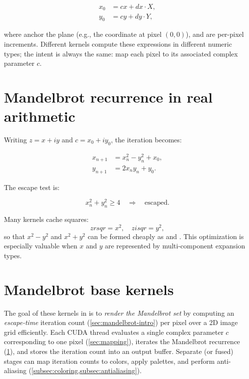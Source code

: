 \begin{align}
x_0 &= cx + dx \cdot X, \\
y_0 &= cy + dy \cdot Y,
\end{align}

where  anchor the plane (e.g., the coordinate at pixel \((0,0)\)),
and  are per-pixel increments. Different kernels compute these
expressions in different numeric types; the intent is always the same: map each
pixel to its associated complex parameter \(c\).


\section{Mandelbrot recurrence in real arithmetic}
\label{sec:real-form}

Writing \(z = x + i y\) and \(c = x_0 + i y_0\), the iteration becomes:

\begin{align}
x_{n+1} &= x_n^2 - y_n^2 + x_0, \\
y_{n+1} &= 2 x_n y_n + y_0.
\end{align}

The escape test is:

\begin{equation}
x_n^2 + y_n^2 \ge 4 \quad\Rightarrow\quad \text{escaped.}
\end{equation}

Many kernels cache squares:
\[
zrsqr = x^2,\quad zisqr = y^2,
\]
so that \(x^2-y^2\) and \(x^2+y^2\) can be formed cheaply as 
and . This optimization is especially valuable when \(x\) and \(y\) are
represented by multi-component expansion types.


\section{Mandelbrot base kernels}
\label{sec:mandel-base-kernels}

The goal of these kernels in \FractalShark{} is to \emph{render the Mandelbrot set}
by computing an \emph{escape-time} iteration count (\cref{sec:mandelbrot-intro}) per pixel over a 2D image
grid efficiently. Each CUDA thread evaluates a single complex parameter \(c\)
corresponding to one pixel (\cref{sec:mapping}), iterates the Mandelbrot recurrence (\cref{sec:real-form}), and stores the
iteration count into an output buffer. Separate (or fused) stages can map
iteration counts to colors, apply palettes, and perform anti-aliasing
(\cref{subsec:coloring,subsec:antialiasing}).

